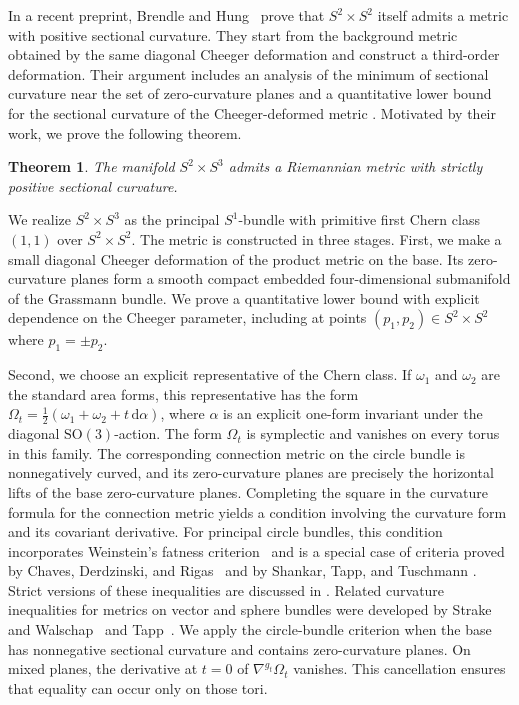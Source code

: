 \documentclass[11pt]{article}
\newtheorem{theorem}{Theorem}[section]
\theoremstyle{definition}
\theoremstyle{remark}
\newcommand{\dd}{\mathrm d}
\begin{document}
In a recent preprint, Brendle and Hung~\cite{BrendleHung2026} prove that
$S^2\times S^2$ itself admits a metric with positive sectional curvature.
They start from the background metric obtained by the same diagonal Cheeger
deformation and construct a
third-order deformation.  Their argument includes an analysis of
the minimum of sectional curvature near the set of zero-curvature planes
\cite[Theorems~2.11 and~2.12]{BrendleHung2026} and a quantitative lower bound
for the sectional curvature of the Cheeger-deformed metric
\cite[Proposition~B.1 and Corollary~B.2]{BrendleHung2026}.  Motivated by their
work, we prove the following theorem.


\begin{theorem}                                                                    \label{thm:main}
The manifold $S^2\times S^3$ admits a Riemannian metric with
strictly positive sectional curvature.
\end{theorem}

We realize $S^2\times S^3$ as the principal $S^1$-bundle with primitive
first Chern class $(1,1)$ over $S^2\times S^2$.  The metric is constructed in
three stages.  First, we make a small diagonal Cheeger deformation of the
product metric on the base.  Its zero-curvature planes form a smooth compact
embedded four-dimensional submanifold of the Grassmann bundle.  We prove a quantitative
lower bound with explicit dependence on the Cheeger parameter, including
at points $(p_1,p_2)\in S^2\times S^2$ where $p_1=\pm p_2$.

Second, we choose an explicit representative of the Chern class.  If
$\omega_1$ and $\omega_2$ are the standard area forms, this representative
has the form $\Omega_t=\tfrac12(\omega_1+\omega_2+t\,\dd\alpha)$, where
$\alpha$ is an explicit one-form invariant under the diagonal
$\mathrm{SO}(3)$-action.  The form $\Omega_t$ is symplectic and vanishes on
every torus in this family.  The
corresponding connection metric on the circle bundle is nonnegatively curved,
and its zero-curvature planes are precisely the horizontal lifts of the base
zero-curvature planes.  Completing the square in the curvature formula for
the connection metric yields a condition involving the curvature form and
its covariant derivative.  For principal circle bundles, this condition
incorporates Weinstein's fatness criterion~\cite{Weinstein1980} and is a
special case of criteria proved by Chaves, Derdzinski, and
Rigas~\cite[main theorem, condition~(ii)]{ChavesDerdzinskiRigas1992} and by
Shankar, Tapp, and Tuschmann
\cite[Theorem~3.1 and Lemma~3.2]{ShankarTappTuschmann2005}.  Strict versions of
these inequalities are discussed in \cite[Section~6]{Ziller2007}.  Related
curvature inequalities for metrics on vector and sphere bundles were developed by Strake and
Walschap~\cite{StrakeWalschap1990} and Tapp~\cite{Tapp2003}.  We apply the
circle-bundle criterion when the base has nonnegative sectional curvature
and contains zero-curvature planes.  On mixed planes, the derivative at
$t=0$ of $\nabla^{g_t}\Omega_t$ vanishes.  This cancellation ensures that
equality can occur only on those tori.
\end{document}
